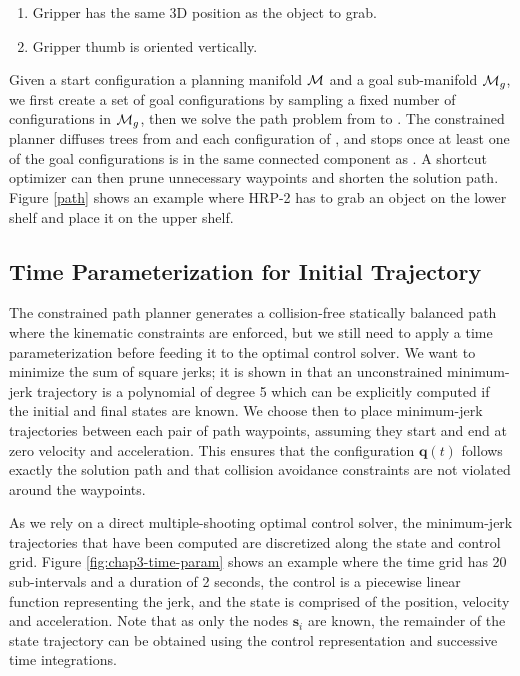 \begin{enumerate}
  \item Gripper has the same 3D position as the object to grab.
  \item Gripper thumb is oriented vertically.
\end{enumerate}

Given a start configuration  a planning manifold $\mathcal{M}$
and a goal sub-manifold $\mathcal{M}_{g}$, we first create a set of goal
configurations  by sampling a fixed number of configurations
in $\mathcal{M}_{g}$, then we solve the path problem from  to
. The constrained planner diffuses trees from  and
each configuration of , and stops once at least one of the
goal configurations is in the same connected component as
. A shortcut optimizer can then prune unnecessary waypoints
and shorten the solution path. Figure \ref{path} shows an example
where HRP-2 has to grab an object on the lower shelf and place it on
the upper shelf.

\subsection{Time Parameterization for Initial Trajectory}
\label{subsec:chap3-time-parameterization}

The constrained path planner generates a collision-free statically
balanced path where the kinematic constraints are enforced, but we
still need to apply a time parameterization before feeding it to the
optimal control solver. We want to minimize the sum of square jerks;
it is shown in \cite{Flash1985} that an unconstrained minimum-jerk
trajectory is a polynomial of degree 5 which can be explicitly
computed if the initial and final states are known. We choose then to
place minimum-jerk trajectories between each pair of path waypoints,
assuming they start and end at zero velocity and acceleration. This
ensures that the configuration $\mathbf{q}(t)$ follows exactly the
solution path and that collision avoidance constraints are not
violated around the waypoints.

As we rely on a direct multiple-shooting optimal control solver, the
minimum-jerk trajectories that have been computed are discretized
along the state and control grid. Figure \ref{fig:chap3-time-param}
shows an example where the time grid has 20 sub-intervals and a
duration of 2 seconds, the control is a piecewise linear function
representing the jerk, and the state is comprised of the position,
velocity and acceleration. Note that as only the nodes $\mathbf{s}_i$
are known, the remainder of the state trajectory can be obtained using
the control representation and successive time integrations.

